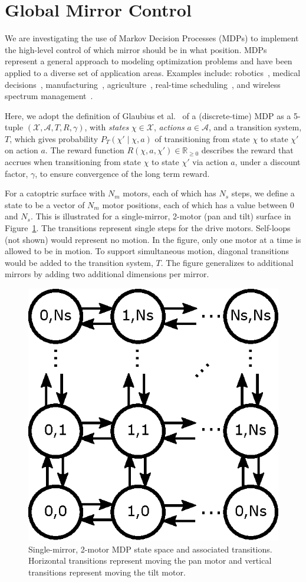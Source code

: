 \section{Global Mirror Control}
\label{sec:mdp}

We are investigating the use of Markov Decision Processes (MDPs) to
implement the high-level control of which mirror should be in what position.
MDPs represent a general approach to modeling optimization
problems and have been applied to a diverse set of
application areas. Examples include: robotics~\cite{ab10},
medical decisions~\cite{ahsr10}, manufacturing~\cite{yyl04},
agriculture~\cite{Kristensen03},
real-time scheduling~\cite{gtsg08},
and wireless spectrum management~\cite{mgc16}.

Here, we adopt the definition of Glaubius et al.~\cite{gtsg08}
of a (discrete-time) MDP as a 5-tuple
$(\mathcal{X}, \mathcal{A}, T, R, \gamma)$, with \emph{states}
$\chi \in \mathcal{X}$, \emph{actions} $a \in \mathcal{A}$,
and a transition system, $T$, which gives probability
$P_T (\chi' \mid \chi, a)$ of transitioning from state $\chi$ to
state $\chi'$ on action $a$.
The reward function $R(\chi, a, \chi') \in \mathbb R_{\ge 0}$ describes the
reward that accrues when transitioning from state $\chi$ to
state $\chi'$ via action $a$, under a discount factor, $\gamma$,
to ensure convergence of the long term reward.

For a catoptric surface with $N_m$ motors, each of which has $N_s$
steps, we define a state to be a vector of $N_m$ motor positions,
each of which has a value between 0 and $N_s$.  This is illustrated
for a single-mirror, 2-motor (pan and tilt) surface in Figure~\ref{fig:mdp2}.
The transitions represent single steps for the drive motors.
Self-loops (not shown) would represent no motion.  In the figure,
only one motor at a time is allowed to be in motion.  To support simultaneous
motion, diagonal transitions would be added to the transition system, $T$.
The figure generalizes to additional mirrors by adding two
additional dimensions per mirror.

\begin{figure}[ht]
\includegraphics[width=0.5\columnwidth]{mdp2}
\caption{Single-mirror, 2-motor MDP state space and associated transitions.
Horizontal transitions represent moving the pan motor and vertical transitions
represent moving the tilt motor.}
\label{fig:mdp2}
\end{figure}

